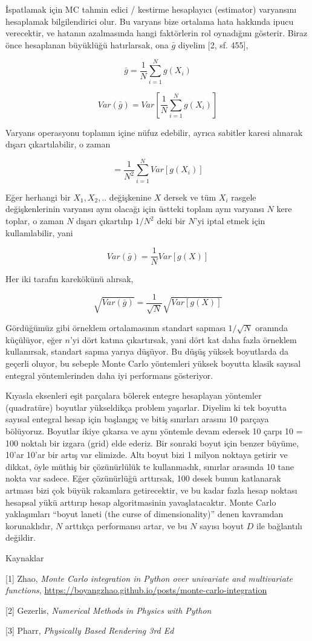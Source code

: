 \documentclass[12pt,fleqn]{article}\usepackage{../../common}
\begin{document}
İspatlamak için MC tahmin edici / kestirme hesaplayıcı (estimator) varyansını
hesaplamak bilgilendirici olur. Bu varyans bize ortalama hata hakkında ipucu
verecektir, ve hatanın azalmasında hangi faktörlerin rol oynadığını
gösterir. Biraz önce hesaplanan büyüklüğü hatırlarsak, ona $\bar{g}$
diyelim [2, sf. 455],

$$
\bar{g} = \frac{1}{N} \sum_{i=1}^{N} g(X_i)
$$

$$
Var(\bar{g}) = Var \left[ \frac{1}{N} \sum_{i=1}^{N} g(X_i)  \right]
$$

Varyans operasyonu toplamın içine nüfuz edebilir, ayrıca sabitler karesi
alınarak dışarı çıkartılabilir, o zaman

$$
= \frac{1}{N^2} \sum_{i=1}^{N} Var[ g(X_i)]  
$$

Eğer herhangi bir $X_1,X_2,..$ değişkenine $X$ dersek ve tüm $X_i$ rasgele
değişkenlerinin varyansı aynı olacağı için üstteki toplam aynı varyansı $N$
kere toplar, o zaman $N$ dışarı çıkartılıp $1/N^2$ deki bir $N$'yi iptal etmek
için kullanılabilir, yani 

$$
Var(\bar{g}) = \frac{1}{N} Var[ g(X)]  
$$

Her iki tarafın karekökünü alırsak,

$$
\sqrt{Var(\bar{g})} = \frac{1}{\sqrt{N}} \sqrt{Var[ g(X)]}
$$

Gördüğümüz gibi örneklem ortalamasının standart sapması $1/\sqrt{N}$ oranında
küçülüyor, eğer $n$'yi dört katına çıkartırsak, yani dört kat daha fazla
örneklem kullanırsak, standart sapma yarıya düşüyor. Bu düşüş yüksek boyutlarda
da geçerli oluyor, bu sebeple Monte Carlo yöntemleri yüksek boyutta klasik
sayısal entegral yöntemlerinden daha iyi performans gösteriyor.

Kıyasla eksenleri eşit parçalara bölerek entegre hesaplayan yöntemler
(quadratüre) boyutlar yükseldikça problem yaşarlar. Diyelim ki tek boyutta
sayısal entegral hesap için başlangıç ve bitiş sınırları arasını 10 parçaya
bölüyoruz. Boyutlar ikiye çıkarsa ve aynı yöntemle devam edersek 10 çarpı 10 =
100 noktalı bir izgara (grid) elde ederiz. Bir sonraki boyut için benzer büyüme,
10'ar 10'ar bir artış var elimizde. Altı boyut bizi 1 milyon noktaya getirir ve
dikkat, öyle müthiş bir çözünürlülük te kullanmadık, sınırlar arasında 10 tane
nokta var sadece. Eğer çözünürlüğü arttırsak, 100 desek bunun katlanarak artması
bizi çok büyük rakamlara getirecektir, ve bu kadar fazla hesap noktası hesapsal
yükü arttırıp hesap algoritmasinin yavaşlatacaktır. Monte Carlo yaklaşımları
``boyut laneti (the curse of dimensionality)'' denen kavramdan korunaklıdır, $N$
arttıkça performansı artar, ve bu $N$ sayısı boyut $D$ ile bağlantılı değildir.

Kaynaklar

[1] Zhao, {\em Monte Carlo integration in Python over univariate and multivariate functions},
    \url{https://boyangzhao.github.io/posts/monte-carlo-integration}

[2] Gezerlis, {\em Numerical Methods in Physics with Python}
    
[3] Pharr, {\em Physically Based Rendering 3rd Ed}
\end{document}
